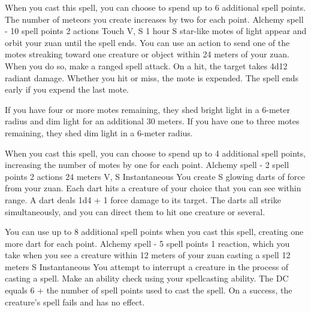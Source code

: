         When you cast this spell, you can choose to spend up to 6 additional spell points.
        The number of meteors you create increases by two for each point.
        {Alchemy spell - 10 spell points}
        {2 actions}
        {Touch}
        {V, S}
        {1 hour}
        S star-like motes of light appear and orbit your zuan until the spell ends.
        You can use an action to send one of the motes streaking toward one creature or object within 24 meters of your zuan.
        When you do so, make a ranged spell attack.
        On a hit, the target takes 4d12 radiant damage.
        Whether you hit or miss, the mote is expended.
        The spell ends early if you expend the last mote.

        If you have four or more motes remaining, they shed bright light in a 6-meter radius and dim light for an additional 30 meters.
        If you have one to three motes remaining, they shed dim light in a 6-meter radius.

        When you cast this spell, you can choose to spend up to 4 additional spell points, increasing the number of motes by one for each point.
        {Alchemy spell - 2 spell points}
        {2 actions}
        {24 meters}
        {V, S}
        {Instantaneous}
        You create S glowing darts of force from your zuan.
        Each dart hits a creature of your choice that you can see within range.
        A dart deals 1d4 + 1 force damage to its target.
        The darts all strike simultaneously, and you can direct them to hit one creature or several.

        You can use up to 8 additional spell points when you cast this spell, creating one more dart for each point.
        {Alchemy spell - 5 spell points}
        {1 reaction, which you take when you see a creature within 12 meters of your zuan casting a spell}
        {12 meters}
        {S}
        {Instantaneous}
        You attempt to interrupt a creature in the process of casting a spell.
        Make an ability check using your spellcasting ability.
        The DC equals 6 + the number of spell points used to cast the spell.
        On a success, the creature's spell fails and has no effect.

